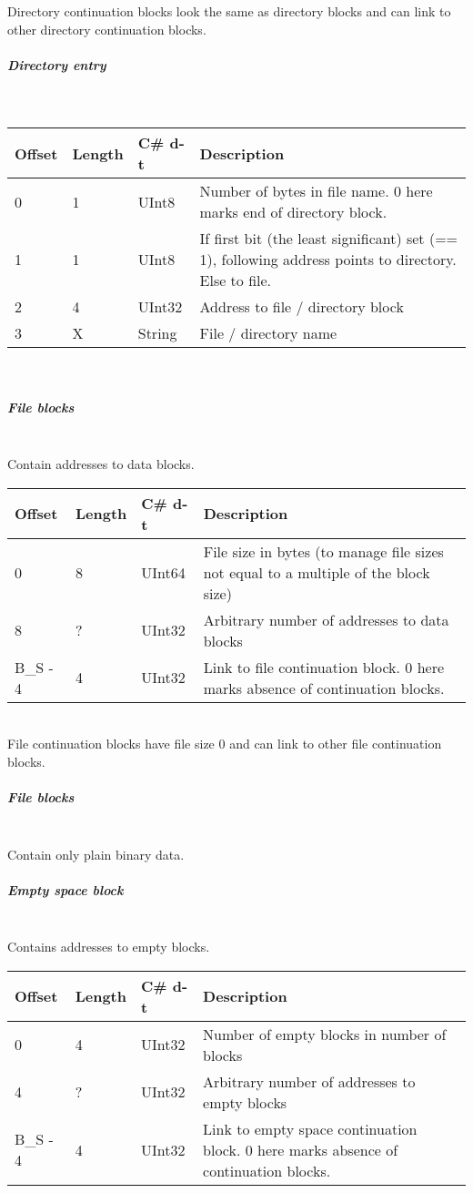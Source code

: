 \documentclass[a4paper,12pt]{article}
\begin{document}
Directory continuation blocks look the same as directory blocks and can link to other directory continuation blocks.

\subparagraph{Directory entry} \mbox{} \\

\begin{tabular}{|p{1.5cm}|p{1.5cm}|p{1.5cm}|p{7cm}|}\hline
Offset 	&Length	&C\# d-t	&Description\\\hline
0		&1		&UInt8	&Number of bytes in file name. 0 here marks end of directory block.\\
1		&1		&UInt8	&If first bit (the least significant) set (== 1), following address points to directory. Else to file.\\
2		&4		&UInt32	&Address to file / directory block\\
3		&X		&String	&File / directory name\\
\hline
\end{tabular} \\

\subparagraph{File blocks} \mbox{} \\

Contain addresses to data blocks.\\

\begin{tabular}{|p{1.5cm}|p{1.5cm}|p{1.5cm}|p{7cm}|}\hline
Offset 	&Length	&C\# d-t	&Description\\\hline
0	&8	&UInt64	&File size in bytes (to manage file sizes not equal to a multiple of the block size)\\
8	&?	&UInt32	&Arbitrary number of addresses to data blocks\\
B\_S - 4	&4	&UInt32	&Link to file continuation block. 0 here marks absence of continuation blocks.\\\hline
\end{tabular} \\

File continuation blocks have file size 0 and can link to other file continuation blocks.

\subparagraph{File blocks} \mbox{} \\

Contain only plain binary data.

\subparagraph{Empty space block} \mbox{} \\

Contains addresses to empty blocks.\\

\begin{tabular}{|p{1.5cm}|p{1.5cm}|p{1.5cm}|p{7cm}|}\hline
Offset 	&Length	&C\# d-t	&Description\\\hline
0	&4	&UInt32	&Number of empty blocks in number of blocks\\
4	&?	&UInt32	&Arbitrary number of addresses to empty blocks\\
B\_S - 4	&4	&UInt32	&Link to empty space continuation block. 0 here marks absence of continuation blocks.\\\hline
\end{tabular} \\
\end{document}
